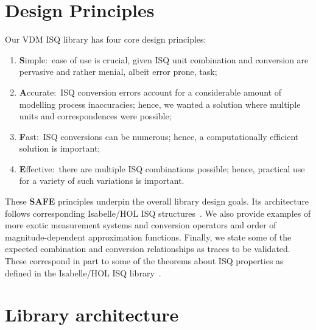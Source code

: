 \documentclass[runningheads,a4paper]{llncs}
\begin{document}

\section{Design Principles}\label{sec:principles}

Our VDM ISQ library has four core design principles:

	\begin{enumerate}
		\item \textbf{S}imple:~ease of use is crucial, given ISQ unit combination and conversion are pervasive and rather menial, albeit error prone, task;
		 
		\item \textbf{A}ccurate:~ISQ conversion errors account for a considerable amount of modelling process inaccuracies; hence, we wanted a solution where multiple units and correspondences were possible;
		 
		\item \textbf{F}ast:~ISQ conversions can be numerous; hence, a computationally efficient solution is important;
		 
		\item \textbf{E}ffective:~there are multiple ISQ combinations possible; hence, practical use for a variety of such variations is important.   
	\end{enumerate}
        
These \textbf{SAFE} principles underpin the overall library design goals. Its architecture follows corresponding Isabelle/HOL ISQ structures~\cite{Physical_Quantities-AFP}. We also provide examples of more exotic measurement systems and conversion operators and order of magnitude-dependent approximation functions. Finally, we state some of the expected combination and conversion relationships as traces to be validated. These correspond in part to some of the theorems about ISQ properties as defined in the Isabelle/HOL ISQ library~\cite{Physical_Quantities-AFP}.   

\section{Library architecture}\label{sec:architecture}
\end{document}
